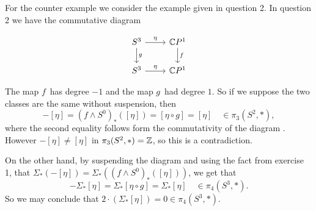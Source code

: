 \begin{exercise}[1 \& 2]
For the counter example we consider the example given in question 2. 
In question 2 we have the commutative diagram

\begin{equation}
\label{dgr:1}
\begin{tikzcd}
S^3 \arrow[r, "\eta"] \arrow[d, "g"] & \C P^1 \arrow[d, "f"] \\
S^3 \arrow[r, "\eta"] & \C P^1 
\end{tikzcd}
\end{equation}

The map $f$ has degree $-1$ and the map $g$ had degree $1$. So if we suppose 
the two classes are the same without suspension, then 
\[ -[\eta] = (f \wedge S^0)_* ([\eta]) = [ \eta \circ g ] = [\eta] \quad\in
\pi_3(S^2, *), \]
where the second equality follows form the commutativity of the diagram
. However $-[\eta] \ne [\eta]$ in $\pi_3(S^2, *) = \mathbb{Z}$, so this is a contradiction.

On the other hand, by suspending the diagram  and using the fact
from exercise 1, that $\Sigma_* (-[\eta]) = \Sigma_* ( (f \wedge S^0)_* ([\eta])
)$, we get that 
\[ -\Sigma_*[\eta] = \Sigma_* [ \eta \circ g ] = \Sigma_* [\eta]
\quad\in\pi_4(S^3,*). \]
So we may conclude that $2 \cdot (\Sigma_*[\eta]) = 0 \in \pi_4(S^3,*)$.
\end{exercise}

